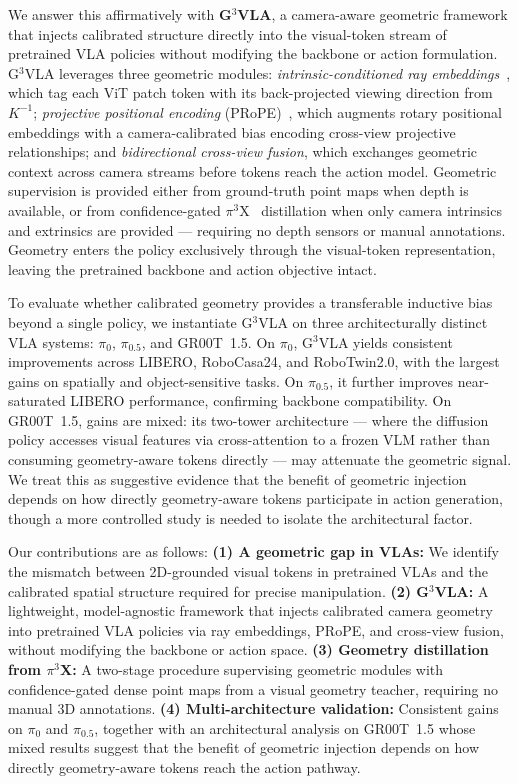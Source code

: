 \documentclass{article}
\begin{document}
We answer this affirmatively with \textbf{G$^3$VLA}, a camera-aware geometric 
framework that injects calibrated structure directly into the visual-token 
stream of pretrained VLA policies without modifying the backbone or action 
formulation. G$^3$VLA leverages three geometric modules: 
\textit{intrinsic-conditioned ray embeddings}~\citep{zhang2024cameras}, which 
tag each ViT patch token with its back-projected viewing direction from $K^{-1}$; 
\textit{projective positional encoding} (PRoPE)~\citep{li2025cameras}, which 
augments rotary positional embeddings with a camera-calibrated bias encoding 
cross-view projective relationships; and \textit{bidirectional cross-view 
fusion}, which exchanges geometric context across camera streams before tokens 
reach the action model. Geometric supervision is provided either from 
ground-truth point maps when depth is available, or from confidence-gated 
$\pi^3$X~\citep{wang2025pi3} distillation when only camera intrinsics and 
extrinsics are provided --- requiring no depth sensors or manual annotations. 
Geometry enters the policy exclusively through the visual-token representation, 
leaving the pretrained backbone and action objective intact.


To evaluate whether calibrated geometry provides a transferable inductive bias 
beyond a single policy, we instantiate G$^3$VLA on three architecturally 
distinct VLA systems: $\pi_0$, $\pi_{0.5}$, and GR00T~1.5. On $\pi_0$, 
G$^3$VLA yields consistent improvements across LIBERO, RoboCasa24, and 
RoboTwin2.0, with the largest gains on spatially and object-sensitive tasks. 
On $\pi_{0.5}$, it further improves near-saturated LIBERO performance, 
confirming backbone compatibility. On GR00T~1.5, gains are mixed: its 
two-tower architecture --- where the diffusion policy accesses visual features 
via cross-attention to a frozen VLM rather than consuming geometry-aware tokens 
directly --- may attenuate the geometric signal. We treat this as suggestive 
evidence that the benefit of geometric injection depends on how directly 
geometry-aware tokens participate in action generation, though a more 
controlled study is needed to isolate the architectural factor.

Our contributions are as follows: \textbf{(1) A geometric gap in VLAs:} We identify the mismatch between 2D-grounded visual tokens in pretrained VLAs and the calibrated spatial 
structure required for precise manipulation. \textbf{(2) G$^3$VLA:} A lightweight, model-agnostic framework that injects calibrated camera geometry into pretrained VLA policies via ray embeddings, PRoPE, and cross-view fusion, without modifying the backbone or action space. \textbf{(3) Geometry distillation from $\pi^3$X:} A two-stage procedure supervising geometric modules with confidence-gated dense point maps from a visual geometry teacher, requiring no manual 3D annotations. \textbf{(4) Multi-architecture validation:} Consistent gains on $\pi_0$ and $\pi_{0.5}$, together with an architectural analysis on GR00T~1.5 whose mixed results suggest that the benefit of geometric injection depends on how directly geometry-aware tokens reach the action pathway.
\end{document}
